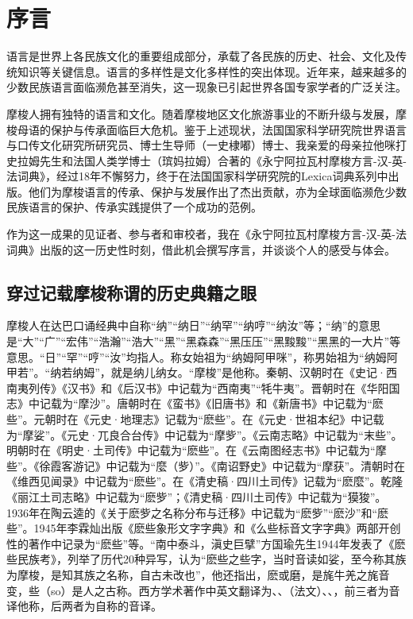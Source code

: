 \languecmncn

\chapter*{序言}

语言是世界上各民族文化的重要组成部分，承载了各民族的历史、社会、文化及传统知识等关键信息。语言的多样性是文化多样性的突出体现。近年来，越来越多的少数民族语言面临濒危甚至消失，这一现象已引起世界各国专家学者的广泛关注。

摩梭人拥有独特的语言和文化。随着摩梭地区文化旅游事业的不断升级与发展，摩梭母语的保护与传承面临巨大危机。鉴于上述现状，法国国家科学研究院世界语言与口传文化研究所研究员、博士生导师（一史棣嘟）博士、我亲爱的母亲拉他咪打史拉姆先生和法国人类学博士（瑸妈拉姆）合著的《永宁阿拉瓦村摩梭方言-汉-英-法词典》，经过18年不懈努力，终于在法国国家科学研究院的Lexica词典系列中出版。他们为摩梭语言的传承、保护与发展作出了杰出贡献，亦为全球面临濒危少数民族语言的保护、传承实践提供了一个成功的范例。

作为这一成果的见证者、参与者和审校者，我在《永宁阿拉瓦村摩梭方言-汉-英-法词典》出版的这一历史性时刻，借此机会撰写序言，并谈谈个人的感受与体会。

\section*{穿过记载摩梭称谓的历史典籍之眼}

摩梭人在达巴口诵经典中自称“纳”“纳日”“纳罕”“纳哼”“纳汝”等；“纳”的意思是“大”“广”“宏伟”“浩瀚”“浩大”“黑”“黑森森”“黑压压”“黑黢黢”“黑黑的一大片”等意思。“日”“罕”“哼”“汝”均指人。称女始祖为“纳姆阿甲咪”，称男始祖为“纳姆阿甲若”。“纳若纳姆”，就是纳儿纳女。“摩梭”是他称。秦朝、汉朝时在《史记·西南夷列传》《汉书》和《后汉书》中记载为“西南夷”“牦牛夷”。晋朝时在《华阳国志》中记载为“摩沙”。唐朝时在《蛮书》《旧唐书》和《新唐书》中记载为“麽些”。元朝时在《元史·地理志》记载为“麽些”。在《元史·世祖本纪》中记载为“摩娑”。《元史·兀良合台传》中记载为“摩㱔”。《云南志略》中记载为“末些”。明朝时在《明史·土司传》中记载为“麽些”。在《云南图经志书》中记载为“摩些”。《徐霞客游记》中记载为“麼（㱔）”。《南诏野史》中记载为“摩获”。清朝时在《维西见闻录》中记载为“麽些”。在《清史稿·四川土司传》记载为“麽麼”。乾隆《丽江土司志略》中记载为“麽㱔”；《清史稿·四川土司传》中记载为“獏狻”。1936年在陶云逵的《关于麽㱔之名称分布与迁移》中记载为“麽㱔”“麽沙”和“麽些”。1945年李霖灿出版《麽些象形文字字典》和《么些标音文字字典》两部开创性的著作中记录为“麽些”等。“南中泰斗，滇史巨擘”方国瑜先生1944年发表了《麽些民族考》，列举了历代20种异写，认为“麽些之些字，当时音读如娑，至今称其族为摩梭，是知其族之名称，自古未改也”，他还指出，麽或磨，是旄牛羌之旄音变，些（so）是人之古称。西方学术著作中英文翻译为、、（法文）、、，前三者为音译他称，后两者为自称的音译。

